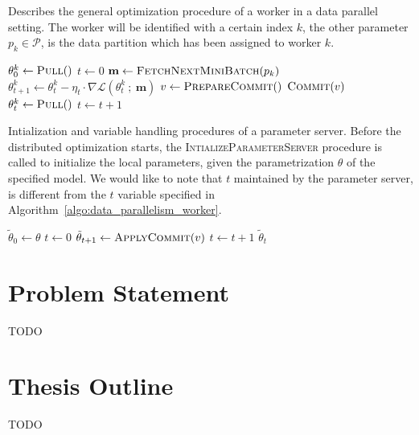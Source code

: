 \begin{algorithm}[H]
  \caption{Describes the general optimization procedure of a worker in a data parallel setting. The worker will be identified with a certain index $k$, the other parameter $p_k \in \mathcal{P}$, is the data partition which has been assigned to worker $k$.}
  \label{algo:data_parallelism_worker}
  \begin{algorithmic}[1]
    \State $\theta^k_0 \gets \Call{Pull}{ }$
    \State $t \gets 0$
    \State $\textbf{m} \gets \Call{FetchNextMiniBatch}{p_k}$
    \State $\theta^k_{t + 1} \gets \theta^k_t - \eta_t \cdot \nabla \mathcal{L}(\theta^k_t~;~\textbf{m})$ 
    \State $v \gets \Call{PrepareCommit}{ }$
    \State $\Call{Commit}{v}$
    \State $\theta^k_t \gets \Call{Pull}{ }$
    \State $t \gets t + 1$
    \EndWhile
    \EndProcedure
  \end{algorithmic}
\end{algorithm}

\begin{algorithm}[H]
  \caption{Intialization and variable handling procedures of a parameter server. Before the distributed optimization starts, the \textsc{IntializeParameterServer} procedure is called to initialize the local parameters, given the parametrization $\theta$ of the specified model. We would like to note that $t$ maintained by the parameter server, is different from the $t$ variable specified in Algorithm~\ref{algo:data_parallelism_worker}.}
  \label{algo:data_parallelism_parameter_server}
  \begin{algorithmic}[1]
    \State $\tilde{\theta}_0 \gets \theta$
    \State $t \gets 0$
    \EndProcedure
    \State
    \State $\tilde{\theta}_{t + 1} \gets \Call{ApplyCommit}{v}$
    \State $t \gets t + 1$
    \EndProcedure
    \State
    \State \Return $\tilde{\theta}_t$
    \EndProcedure
  \end{algorithmic}
\end{algorithm}

\section{Problem Statement}
\label{sec:problem_statement}

TODO

\section{Thesis Outline}
\label{sec:thesis_outline}

TODO
